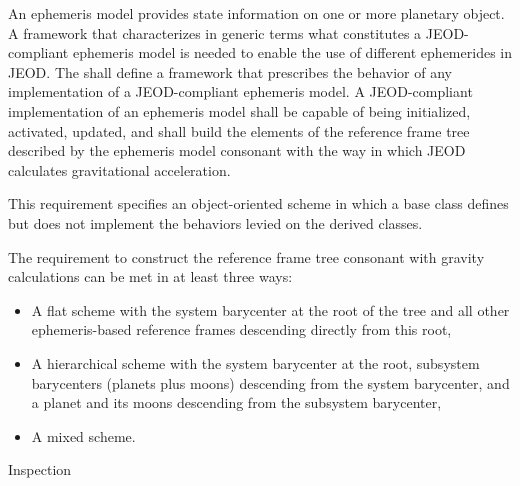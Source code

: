 \label{reqt:ephem_interface}
\begin{description:}
\item[Requirement]
  An ephemeris model provides state information on one or more planetary
  object. A framework that characterizes in generic terms what constitutes
  a JEOD-compliant ephemeris model is needed to enable the use of
  different ephemerides in JEOD.
  \label{reqt:ephem_interface_class}
  The \ModelDesc shall define a framework that prescribes the behavior of
  any implementation of a JEOD-compliant ephemeris model.
  \label{reqt:ephem_interface_extensions}
  A JEOD-compliant implementation of an ephemeris model shall be
  capable of being initialized, activated, updated, and shall build the
  elements of the reference frame tree described by the ephemeris model
  consonant with the way in which JEOD calculates gravitational acceleration.
\item[Rationale]
  This requirement specifies an object-oriented scheme in which a base class
  defines but does not implement the behaviors levied on the derived classes.

  The requirement to construct the reference frame tree consonant with
  gravity calculations can be met in at least three ways:
  \begin{itemize}
  \item A flat scheme with the system barycenter at the root of the tree and all
    other ephemeris-based reference frames descending directly from this root,
  \item A hierarchical scheme with the system barycenter at the root, subsystem
    barycenters (planets plus moons) descending from the system barycenter,
    and a planet and its moons descending from the subsystem barycenter,
  \item A mixed scheme.
  \end{itemize}
  \item[Verification]
  Inspection
\end{description:}

